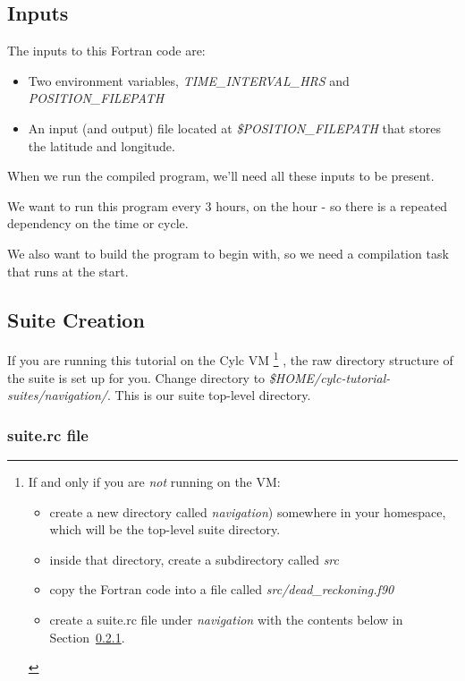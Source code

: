 \subsection{Inputs}

The inputs to this Fortran code are:
\begin{itemize}
    \item Two environment variables, {\em TIME\_INTERVAL\_HRS} and {\em POSITION\_FILEPATH}
    \item An input (and output) file located at {\em \$POSITION\_FILEPATH} that stores the latitude and longitude.
\end{itemize}

When we run the compiled program, we'll need all these inputs to be present.

We want to run this program every 3 hours, on the hour - so there is a repeated dependency on the time or cycle.

We also want to build the program to begin with, so we need a compilation task that runs at the start.

\subsection{Suite Creation}

If you are running this tutorial on the Cylc VM \footnote{
    If and only if you are {\em not} running on the VM:
\begin{itemize}
    \item create a new directory called {\em navigation}) somewhere in your homespace, which will be the top-level suite directory.
    \item inside that directory, create a subdirectory called {\em src}
    \item copy the Fortran code into a file called {\em src/dead\_reckoning.f90}
    \item create a suite.rc file under {\em navigation} with the contents below in Section~\ref{Suite Writing suite.rc file}.
\end{itemize}
} , the raw directory structure of the suite is set up for you. Change directory to {\em \$HOME/cylc-tutorial-suites/navigation/}. This is our suite top-level directory.

\subsubsection{suite.rc file}
\label{Suite Writing suite.rc file}


